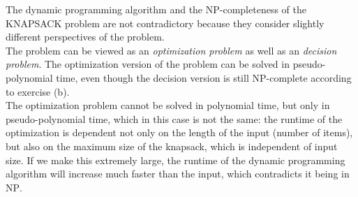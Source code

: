 The dynamic programming algorithm and the \textsc{NP}-completeness of the \textsc{KNAPSACK} problem are not contradictory because they consider slightly different perspectives of the problem.\\
The problem can be viewed as an \textit{optimization problem} as well as an \textit{decision problem}. The optimization version of the problem can be solved in pseudo-polynomial time, even though the decision version is still \textsc{NP}-complete according to exercise (b).\\
The optimization problem cannot be solved in polynomial time, but only in pseudo-polynomial time, which in this case is not the same: the runtime of the optimization is dependent not only on the length of the input (number of items), but also on the maximum size of the knapsack, which is independent of input size. If we make this extremely large, the runtime of the dynamic programming algorithm will increase much faster than the input, which contradicts it being in \textsc{NP}.


